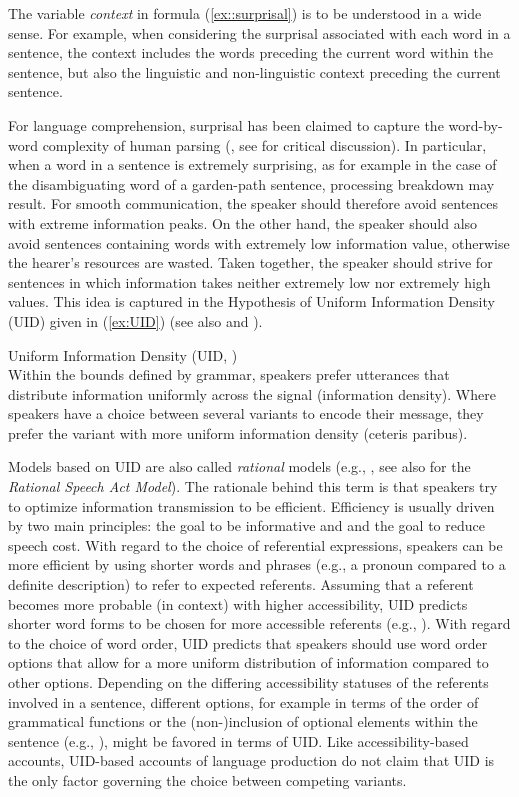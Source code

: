 \documentclass[output=paper,colorlinks,citecolor=brown]{langscibook}
\begin{document}
The variable \textit{context} in formula (\ref{ex::surprisal}) is to be understood in a wide sense. For example, when considering the surprisal associated with each word in a sentence, the context includes the words preceding the current word within the sentence, but also the linguistic and non-linguistic context preceding the current sentence.

For language comprehension, surprisal has been claimed to capture the word-by-word complexity of human parsing (\citealt{Levy-08-Expectation-based-syntactic-comprehension}, see \citealt{Levy-13} for critical discussion). In particular, when a word in a sentence is extremely surprising, as for example in the case of the disambiguating word of a garden-path sentence, processing breakdown may result. For smooth communication, the speaker should therefore avoid sentences with extreme information peaks. On the other hand, the speaker should also avoid sentences containing words with extremely low information value, otherwise the hearer's resources are wasted. Taken together, the speaker should strive for sentences in which information takes neither extremely low nor extremely high values. This idea is captured in the Hypothesis of Uniform Information Density (UID) given in (\ref{ex:UID}) (see also \citealt{Fenk-Oczlon-89} and \citealt{Levy::Jaeger-06}).

\ea Uniform Information Density (UID, \citealt[25]{Jaeger-10})\label{ex:UID}\\
Within the bounds defined by grammar, speakers prefer utterances that distribute information uniformly across the signal (information density). Where speakers have a choice between several variants to encode their message, they prefer the variant with more uniform information density (ceteris paribus).
\z

Models based on UID are also called \textit{rational} models
(e.g., \citealt{Levy::Jaeger-06, Arnold::Zerkle-19, Orita::al-21}, see also \citealt{Frank::Goodman-12} for the \textit{Rational Speech Act Model}). The rationale behind this term is that speakers try to optimize information transmission to be efficient. Efficiency is usually driven by two main principles: the goal to be informative and and the goal to reduce speech cost. With regard to the choice of referential expressions, speakers can be more efficient by using shorter words and phrases (e.g., a pronoun compared to a definite description) to refer to expected referents. Assuming that a referent becomes more probable (in context) with higher accessibility, UID predicts shorter word forms to be chosen for more accessible referents (e.g., \citealt{Tily::Piantadosi-09}).
With regard to the choice of word order, UID predicts that speakers should use word order options that allow for a more uniform distribution of information compared to other options. 
Depending on the differing accessibility statuses of the referents involved in a sentence, different options, for example in terms of the order of grammatical functions or the (non-)inclusion of optional elements within the sentence (e.g., \citealt{Jaeger-10}), might be favored in terms of UID.
Like accessibility-based accounts, UID-based accounts of language production do not claim that UID is the only factor governing the choice between competing variants. 
\end{document}

